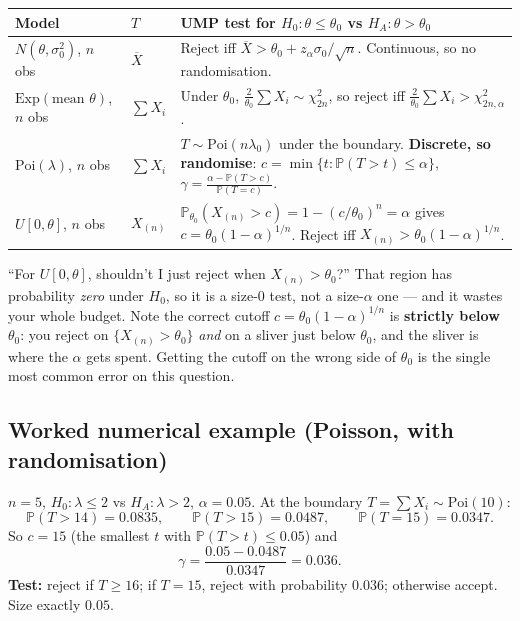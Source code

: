 \documentclass[11pt]{article}
\newcommand{\Prob}{\mathbb{P}}
\newcommand{\Xbar}{\overline{X}}
\begin{document}
\begin{center}
\renewcommand{\arraystretch}{1.6}
\begin{tabular}{@{}p{3.1cm}p{2.4cm}p{9.4cm}@{}}
\toprule
Model & $T$ & UMP test for $H_0:\theta\le\theta_0$ vs $H_A:\theta>\theta_0$ \\
\midrule
$N(\theta,\sigma_0^2)$, $n$ obs & $\Xbar$ &
Reject iff $\Xbar>\theta_0+z_\alpha\sigma_0/\sqrt n$. Continuous, so no randomisation. \\
$\mathrm{Exp}(\text{mean }\theta)$, $n$ obs & $\sum X_i$ &
Under $\theta_0$, $\tfrac{2}{\theta_0}\sum X_i\sim\chi^2_{2n}$, so reject iff
$\tfrac{2}{\theta_0}\sum X_i>\chi^2_{2n,\alpha}$. \\
$\mathrm{Poi}(\lambda)$, $n$ obs & $\sum X_i$ &
$T\sim\mathrm{Poi}(n\lambda_0)$ under the boundary. \textbf{Discrete, so randomise}:
$c=\min\{t:\Prob(T>t)\le\alpha\}$, $\gamma=\frac{\alpha-\Prob(T>c)}{\Prob(T=c)}$. \\
$U[0,\theta]$, $n$ obs & $X_{(n)}$ &
$\Prob_{\theta_0}(X_{(n)}>c)=1-(c/\theta_0)^n=\alpha$ gives
$c=\theta_0(1-\alpha)^{1/n}$. Reject iff $X_{(n)}>\theta_0(1-\alpha)^{1/n}$. \\
\bottomrule
\end{tabular}
\end{center}

\begin{confusion}{``For $U[0,\theta]$, shouldn't I just reject when $X_{(n)}>\theta_0$?''}
That region has probability \emph{zero} under $H_0$, so it is a size-$0$ test, not a
size-$\alpha$ one --- and it wastes your whole budget. Note the correct cutoff
$c=\theta_0(1-\alpha)^{1/n}$ is \textbf{strictly below} $\theta_0$: you reject on
$\{X_{(n)}>\theta_0\}$ \emph{and} on a sliver just below $\theta_0$, and the sliver is where
the $\alpha$ gets spent. Getting the cutoff on the wrong side of $\theta_0$ is the single most
common error on this question.
\end{confusion}

\subsection{Worked numerical example (Poisson, with randomisation)}

$n=5$, $H_0:\lambda\le2$ vs $H_A:\lambda>2$, $\alpha=0.05$. At the boundary
$T=\sum X_i\sim\mathrm{Poi}(10)$:
\[
\Prob(T>14)=0.0835,\qquad \Prob(T>15)=0.0487,\qquad \Prob(T=15)=0.0347 .
\]
So $c=15$ (the smallest $t$ with $\Prob(T>t)\le0.05$) and
\[
\gamma=\frac{0.05-0.0487}{0.0347}=0.036 .
\]
\textbf{Test:} reject if $T\ge16$; if $T=15$, reject with probability $0.036$; otherwise
accept. Size exactly $0.05$.
\end{document}
